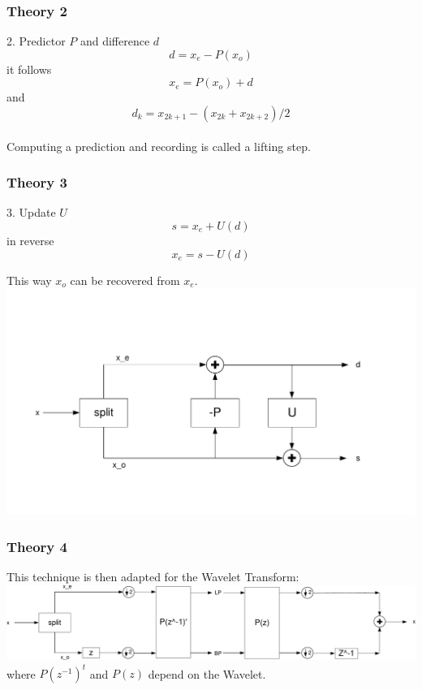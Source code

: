 \documentclass[english, aspectratio=169]{beamer}
\begin{document}
\begin{frame}
\frametitle{Theory 2}
2. Predictor $P$ and difference $d$
\begin{equation}
d = x_e - P(x_o)
\end{equation}
it follows 
\begin{equation}
	x_e = P(x_o) + d
\end{equation}
and
\begin{equation}
	d_k = x_{2k+1} - (x_{2k} + x_{2k+2})/2
\end{equation}\\
Computing a prediction and recording is called a lifting step.
\end{frame}
\begin{frame}
\frametitle{Theory 3}
3. Update $U$ 
\begin{equation}
	s = x_e + U(d)
\end{equation}
in reverse
\begin{equation}
x_e = s -U(d)
\end{equation}

This way $x_o$ can be recovered from $x_e$.
\includegraphics[scale=0.5]{lifting_step.pdf}
\end{frame}
\begin{frame}
\frametitle{Theory 4}
	This technique is then adapted for the Wavelet Transform: 
	\includegraphics[scale=0.3]{lifting_step_wavelet.pdf}\\
	where $P(z^{-1})^t$ and $P(z)$ depend on the Wavelet.
	
\end{frame}
\end{document}
